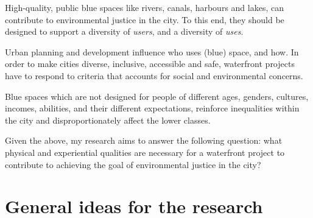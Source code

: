\documentclass{article}
\begin{document}
High-quality, public blue spaces like rivers, canals, harbours and lakes, can contribute to environmental justice in the city.
To this end, they should be designed to support a diversity of \textit{users}, and a diversity of \textit{uses}.


Urban planning and development influence who uses (blue) space, and how.
In order to make cities diverse, inclusive, accessible and safe, %
waterfront projects have to respond to criteria that accounts for social and environmental concerns. 

Blue spaces which are not designed for people of different ages, genders, cultures, incomes, abilities, and their different expectations, reinforce inequalities within the city and disproportionately affect the lower classes.

Given the above, my research aims to answer the following question: 
what physical and experiential qualities are necessary for a waterfront project to contribute to achieving the goal of environmental justice in the city?



\section{General ideas for the research}
\end{document}
